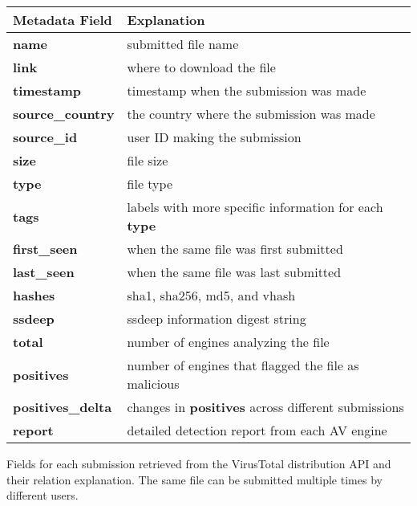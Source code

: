 
\begin{table}[h!]
\centering
\footnotesize
{
\begin{tabular}{l|l}
\hline
Metadata Field & Explanation \\
\hline                            
{\bf name}      & submitted file name \\
{\bf link}      & where to download the file \\
{\bf timestamp} & timestamp when the submission was made \\
{\bf source\_country} & the country where the submission was made \\
{\bf source\_id} & user ID making the submission\\
{\bf size} & file size \\
{\bf type} & file type \\
{\bf tags} & labels with more specific information for each {\bf type}\\
{\bf first\_seen} & when the same file was first submitted \\
{\bf last\_seen} & when the same file was last submitted \\
{\bf hashes} & sha1, sha256, md5, and vhash\\
{\bf ssdeep} & ssdeep information digest string \\
{\bf total} & number of engines analyzing the file \\
{\bf positives} & number of engines that flagged the file as malicious \\
{\bf positives\_delta} & changes in {\bf positives} across different submissions\\
{\bf report} & detailed detection report from each AV engine \\
\hline

\end{tabular}
}
{ 
Fields for each submission retrieved from the VirusTotal distribution API and their relation explanation.
The same file can be submitted multiple times by different users.
}
\end{table}


